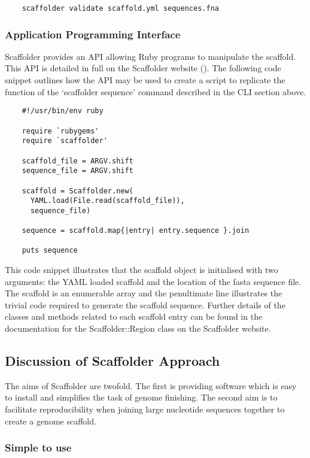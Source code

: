 \documentclass[10pt]{bmc_article}
\newenvironment{bmcformat}{\begin{raggedright}\baselineskip20pt\sloppy\setboolean{publ}{false}}{\end{raggedright}\baselineskip20pt\sloppy}
\begin{document}
\begin{bmcformat}
  \begin{verbatim}
    scaffolder validate scaffold.yml sequences.fna
  \end{verbatim}

\subsubsection*{Application Programming Interface} %

Scaffolder provides an API allowing Ruby programs to manipulate the scaffold.
This API is detailed in full on the Scaffolder website (\scaffolder). The
following code snippet outlines how the API may be used to create a script to
replicate the function of the `scaffolder sequence' command described in the
CLI section above. \pb

  \begin{verbatim}
    #!/usr/bin/env ruby

    require `rubygems'
    require `scaffolder'

    scaffold_file = ARGV.shift
    sequence_file = ARGV.shift

    scaffold = Scaffolder.new(
      YAML.load(File.read(scaffold_file)),
      sequence_file)

    sequence = scaffold.map{|entry| entry.sequence }.join

    puts sequence
  \end{verbatim}

This code snippet illustrates that the scaffold object is initialised with two
arguments: the YAML loaded scaffold and the location of the fasta sequence
file. The scaffold is an enumerable array and the penultimate line illustrates
the trivial code required to generate the scaffold sequence. Further details of
the classes and methods related to each scaffold entry can be found in the
documentation for the Scaffolder::Region class on the Scaffolder website. \pb

\subsection*{Discussion of Scaffolder Approach} %

The aims of Scaffolder are twofold. The first is providing software which is
easy to install and simplifies the task of genome finishing. The second aim is
to facilitate reproducibility when joining large nucleotide sequences together
to create a genome scaffold. \pb

\subsubsection*{Simple to use} %


\end{bmcformat}
\end{document}
